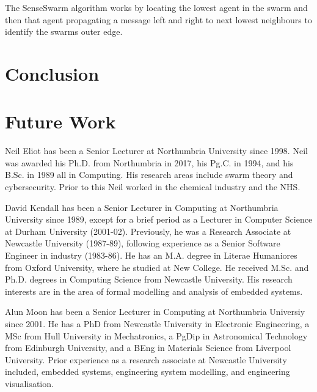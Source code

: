 \documentclass{ieeeaccess}
\begin{document}
The SenseSwarm algorithm works by locating the lowest agent in the swarm and then that agent propagating a message left and right to next lowest neighbours to identify the swarms outer edge. 

\section{Conclusion}\label{sec:conclusion}
\section{Future Work}\label{sec:FutureWork}




    \begin{IEEEbiography}{Neil Eliot}
	has been a Senior Lecturer at Northumbria University since 1998.  Neil was awarded his Ph.D. from Northumbria in 2017, his Pg.C. in 1994, and his B.Sc. in 1989 all in Computing. His research areas include swarm theory and cybersecurity. Prior to this Neil worked in the chemical industry and the NHS. 
	\end{IEEEbiography}
	
	\begin{IEEEbiography}{David Kendall}
	has been a Senior Lecturer in Computing at Northumbria University since 1989, except for a brief period as a Lecturer in Computer Science at Durham University (2001-02). Previously, he was a Research Associate at Newcastle University (1987-89), following experience as a Senior Software Engineer in industry (1983-86). He has an M.A. degree in Literae Humaniores from Oxford University, where he studied at New College. He received M.Sc. and Ph.D. degrees in Computing Science from Newcastle University. His research interests are in the area of formal modelling and analysis of embedded systems. 
	\end{IEEEbiography}
	
	\begin{IEEEbiography}{Alun Moon} has been a Senior Lecturer in Computing at Northumbria Universiy since 2001. He has a PhD from Newcastle University in Electronic Engineering, a MSc from Hull University in Mechatronics, a PgDip in Astronomical Technology from Edinburgh University, and a BEng in Materials Science from Liverpool University.
		Prior experience as a research associate at Newcastle University included, embedded systems, engineering system modelling, and engineering visualisation.
	\end{IEEEbiography}  
		
\end{document}

